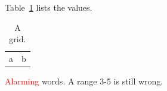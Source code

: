 \documentclass[aps, prb]{revtex4-2} %
\begin{document}
Table~\ref{tab:grid} lists the values.

\begin{table}[tbp]
  \begin{tabular}{|l|r|} %
    a & b \\
  \end{tabular}
  \caption{A grid.} %
  \label{tab:grid}
\end{table}

\textcolor{red}{Alarming} words. %
A range 3-5 is still wrong. %
\end{document}

